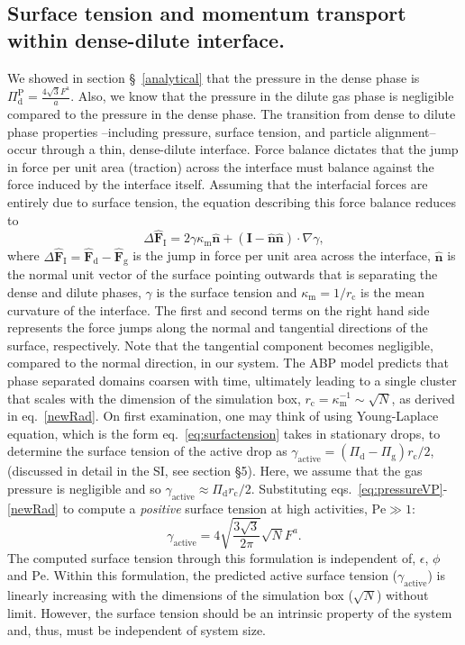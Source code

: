 \documentclass[twoside,twocolumn,9pt]{article}
\begin{document}
\subsection{Surface tension and momentum transport within dense-dilute interface.}

We showed in section \S~\ref{analytical} that the pressure in the dense phase is $\Pi_\text{d}^\text{P} =\frac{4\sqrt{3} F^\text{a}}{a}$. Also, we know that the pressure in the dilute gas phase is negligible compared to the pressure in the dense phase. The transition from dense to dilute phase properties --including pressure, surface tension, and particle alignment-- occur through a thin, dense-dilute interface. 
Force balance dictates that the jump in force per unit area (traction) across the interface must balance against the force induced by the interface itself. Assuming that the interfacial forces are entirely due to surface tension, the equation describing this force balance reduces to
\begin{equation}
    \Delta \mathbf{\hat{F}}_\text{I}=2\gamma \kappa_\text{m} \hat{\mathbf{n}}+\left(\mathbf{I}-\hat{\mathbf{n}}\hat{\mathbf{n}}\right) \cdot \nabla \gamma,  
    \label{eq:surfactension}
\end{equation}
where $\Delta \hat{\mathbf{F}}_\text{I}=\hat{\mathbf{F}}_\text{d}-\hat{\mathbf{F}}_\text{g}$ is the jump in force per unit area across the interface, $\hat{\mathbf{n}}$ is the normal unit vector of the surface pointing outwards  that is separating the dense and dilute phases, $\gamma$ is the surface tension and $\kappa_\text{m}=1/r_\text{c}$ is the mean curvature of the interface. The first and second terms on the right hand side represents the force jumps along the normal and tangential directions of the surface, respectively. Note that the tangential component 
becomes negligible, compared to the normal direction, in our system. 
The ABP model predicts that phase separated domains coarsen with time, ultimately leading to  a single cluster that scales with the dimension of the simulation box, $r_\text{c}=\kappa_\text{m}^{-1} \sim \sqrt{N}$, as derived in eq.~\ref{newRad}. On first examination, one may think of using Young-Laplace equation, which is the form eq.~\ref{eq:surfactension} takes in stationary drops, to determine the surface tension of the active drop as $\gamma_\text{active}=\left(\Pi_\text{d} -\Pi_\text{g}\right) r_\text{c}/2$, (discussed in detail in the SI, see section \S5).
Here, we assume that the gas pressure is negligible and so $\gamma_\text{active}\approx\Pi_\text{d} r_\text{c}/2$.
Substituting eqs.~\ref{eq:pressureVP}-\ref{newRad} to compute a \emph{positive} surface tension at high activities, $\mathrm{Pe} \gg 1$:
$$
    \gamma_\text{active}=4\sqrt{\frac{3\sqrt{3}}{2\pi}}\sqrt{N}F^a.
$$
 The computed surface tension through this formulation is independent of, $\epsilon$, $\phi$ and $\mathrm{Pe}$. Within this formulation, the predicted active surface tension ($\gamma_\text{active}$) is linearly increasing with the dimensions of the simulation box ($\sqrt{N}$) without limit. However, the surface tension should be an intrinsic property of the system and, thus, must be independent of system size. 
 
\end{document}
